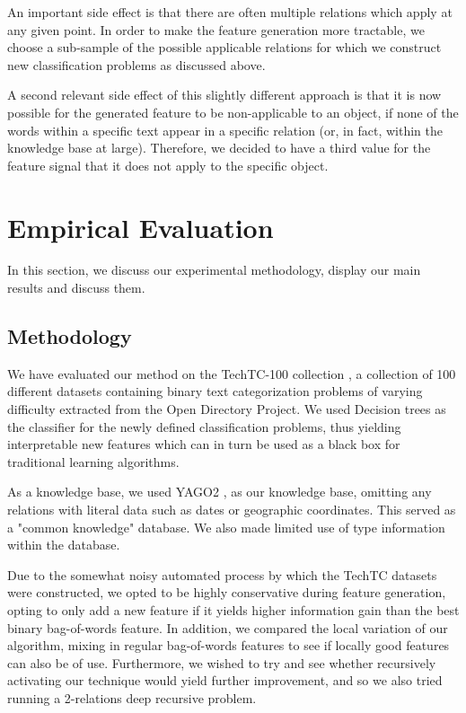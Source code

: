 \documentclass{article}
\theoremstyle{definition}
\begin{document}
An important side effect is that there are often multiple relations which apply at any given point. In order to make the feature generation more tractable, we choose a sub-sample of the possible applicable relations for which we construct new classification problems as discussed above.

A second relevant side effect of this slightly different approach is that it is now possible for the generated feature to be non-applicable to an object, if none of the words within a specific text appear in a specific relation (or, in fact, within the knowledge base at large). Therefore, we decided to have a third value for the feature signal that it does not apply to the specific object.

\section{Empirical Evaluation}
In this section, we discuss our experimental methodology, display our main results and discuss them.
\subsection{Methodology}
We have evaluated our method on the TechTC-100 collection \citep{gabrilovich2004text}, a collection of 100 different datasets containing binary text categorization problems of varying difficulty extracted from the Open Directory Project.
We used Decision trees as the classifier for the newly defined classification problems, thus yielding interpretable new features which can in turn be used as a black box for traditional learning algorithms.

As a knowledge base, we used YAGO2 \citep{hoffart2013yago2}, as our knowledge base, omitting any relations with literal data such as dates or geographic coordinates. This served as a "common knowledge" database. We also made limited use of type information within the database.

Due to the somewhat noisy automated process by which the TechTC datasets were constructed, we opted to be highly conservative during feature generation, opting to only add a new feature if it yields higher information gain than the best binary bag-of-words feature.
In addition, we compared the local variation of our algorithm, mixing in regular bag-of-words features to see if locally good features can also be of use.
Furthermore, we wished to try and see whether recursively activating our technique would yield further improvement, and so we also tried running a 2-relations deep recursive problem. 
\end{document}
